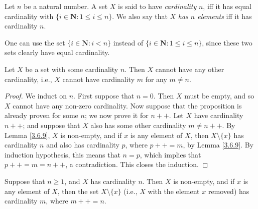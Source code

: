 \begin{definition}\label{3.6.5}
    Let \(n\) be a natural number.
    A set \(X\) is said to have \emph{cardinality} \(n\), iff it has equal cardinality with \(\{i \in \mathbf{N} : 1 \leq i \leq n\}\).
    We also say that \(X\) \emph{has \(n\) elements} iff it has cardinality \(n\).
\end{definition}

\begin{remark}\label{3.6.6}
    One can use the set \(\{i \in \mathbf{N} : i < n\}\) instead of \(\{i \in \mathbf{N} : 1 \leq i \leq n\}\), since these two sets clearly have equal cardinality.
\end{remark}

\setcounter{theorem}{7}
\begin{proposition}\label{3.6.8}
    Let \(X\) be a set with some cardinality \(n\).
    Then \(X\) cannot have any other cardinality, i.e., \(X\) cannot have cardinality \(m\) for any \(m \neq n\).
\end{proposition}

\begin{proof}
    We induct on \(n\).
    First suppose that \(n = 0\).
    Then \(X\) must be empty, and so \(X\) cannot have any non-zero cardinality.
    Now suppose that the proposition is already proven for some \(n\);
    we now prove it for \(n++\).
    Let \(X\) have cardinality \(n++\);
    and suppose that \(X\) also has some other cardinality \(m \neq n++\).
    By Lemma \ref{3.6.9}, \(X\) is non-empty, and if \(x\) is any element of \(X\), then \(X \setminus \{x\}\) has cardinality \(n\) and also has cardinality \(p\), where \(p++ = m\), by Lemma \ref{3.6.9}.
    By induction hypothesis, this means that \(n = p\), which implies that \(p++ = m = n++\), a contradiction.
    This closes the induction.
\end{proof}

\begin{lemma}\label{3.6.9}
    Suppose that \(n \geq 1\), and \(X\) has cardinality \(n\).
    Then \(X\) is non-empty, and if \(x\) is any element of \(X\), then the set \(X \setminus \{x\}\) (i.e., \(X\) with the element \(x\) removed) has cardinality \(m\), where \(m++ = n\).
\end{lemma}


